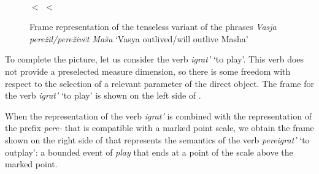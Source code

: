 \begin{figure}
\begin{minipage}{0.6\textwidth}
\end{minipage}\hfill%
\begin{minipage}{0.35\textwidth}\centering
{}\\
 $<$  $<$ 
\end{minipage}
\caption{Frame representation of the tenseless variant of the phrases \textit{Vasja pere\v{z}il/pere\v{z}iv\"{e}t Ma\v{s}u} `Vasya outlived/will outlive Masha'  \label{frame:Vasja:outlive:Masha}}
\end{figure}

To complete the picture, let us consider the verb \textit{igrat'} `to play'. This verb does not provide a preselected measure dimension, so there is some freedom with respect to the selection of a relevant parameter of the direct object. The frame for the verb \textit{igrat'} `to play' is shown on the left side of . 

When the representation of the verb \textit{igrat'} is combined with the representation of the prefix \textit{pere-}   that is compatible with a marked point  scale, we obtain the frame shown on the right side of  that represents the semantics of the verb \textit{pereigrat'} `to outplay': a bounded event of \MANN \textit{play} that ends at a point of the scale above the marked point. 

